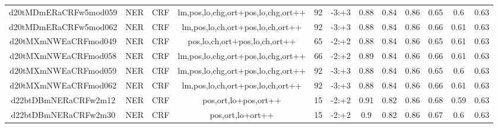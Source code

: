 \documentclass[a4paper]{article}
\begin{document}
\begin{landscape}
\begin{center}
\begin{tabular}{ |c|c|c|c|c|c|c|c|c|c|c|c|}
 	
 
 	
 		
 		\small{ d20tMDmERaCRFw5mod059 } & NER & CRF & lm,pos,lo,chg,ort+pos,lo,chg,ort++  &  92 &  -3:+3  &  0.88 & 0.84 & 0.86  &  0.65 & 0.6 & 0.63 \\
 		

 	
 
 	
 		
 		\small{ d20tMDmERaCRFw5mod062 } & NER & CRF & lm,pos,lo,ch,ort+pos,lo,ch,ort++  &  92 &  -3:+3  &  0.88 & 0.84 & 0.86  &  0.66 & 0.61 & 0.63 \\
 		

 	
 
 	
 		
 		\small{ d20tMXmNWEaCRFmod049 } & NER & CRF & pos,lo,ch,ort+pos,lo,ch,ort++  &  65 &  -2:+2  &  0.88 & 0.84 & 0.86  &  0.65 & 0.61 & 0.63 \\
 		

 	
 
 	
 		
 		\small{ d20tMXmNWEaCRFmod058 } & NER & CRF & lm,pos,lo,chg,ort+pos,lo,chg,ort++  &  66 &  -2:+2  &  0.89 & 0.84 & 0.86  &  0.66 & 0.61 & 0.63 \\
 		

 	
 
 	
 		
 		\small{ d20tMXmNWEaCRFmod059 } & NER & CRF & lm,pos,lo,chg,ort+pos,lo,chg,ort++  &  92 &  -3:+3  &  0.88 & 0.84 & 0.86  &  0.65 & 0.6 & 0.63 \\
 		

 	
 
 	
 		
 		\small{ d20tMXmNWEaCRFmod062 } & NER & CRF & lm,pos,lo,ch,ort+pos,lo,ch,ort++  &  92 &  -3:+3  &  0.88 & 0.84 & 0.86  &  0.66 & 0.61 & 0.63 \\
 		

 	
 
 	
 		
 		\small{ d22btDBmNERaCRFw2m12 } & NER & CRF & pos,ort,lo+pos,ort++  &  15 &  -2:+2  &  0.91 & 0.82 & 0.86  &  0.68 & 0.59 & 0.63 \\
 		

 	
 
 	
 		
 		\small{ d22btDBmNERaCRFw2m30 } & NER & CRF & pos,ort,lo+ort++  &  15 &  -2:+2  &  0.9 & 0.82 & 0.86  &  0.67 & 0.6 & 0.63 \\
 		

 	
 

\end{tabular}
\end{center}
\end{landscape}
\end{document}
